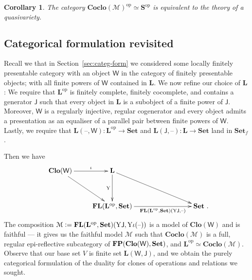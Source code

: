\documentclass[11pt, a4paper, twoside,leqno]{amsart}
\newcommand{\cat}[1]{\mathbf{#1}}
\newcommand{\thg}{{\mathord{\text{--}}}}
\newcommand{\defeq}{\mathrel{\mathop:}=}
\newcommand{\cd}[2][]{\vcenter{\hbox{\xymatrix#1{#2}}}}
\numberwithin{equation}{section}
\theoremstyle{plain}
\newtheorem{Cor}[Thm]{Corollary}
\theoremstyle{definition}
\newcommand{\Set}{\cat{Set}}
\DeclareMathOperator{\FP}{\bf FP}
\DeclareMathOperator{\FL}{\bf FL}
\begin{document}
\begin{Cor}
  \label{cor:cocloMop-qv-theory}
  The category \(\cat{Coclo}(\mathcal{M})^{\mathrm{op}}\simeq \cat{S}^{\mathrm{op}}\) is
  equivalent to the theory of a quasivariety.
\end{Cor}

\subsection{Categorical formulation revisited}
\label{sec:categ-form-revis}

Recall we that in Section~\ref{sec:categ-form} we considered some
locally finitely presentable category with an object \(\mathsf{W}\) in
the category of finitely
presentable objects; with all finite powers of \(\mathsf{W}\)
contained in \(\cat{L}\). We now refine our choice of \(\cat{L}\): We
require that \(\cat{L}^{\mathrm{op}}\) is finitely complete, finitely
cocomplete, and contains a generator \(\mathsf{J}\) such that every
object in \(\cat{L}\) is a subobject of a finite power of
\(\mathsf{J}\). Moreover, \(\mathsf{W}\) is a regularly injective, regular
cogenerator and every object admits a presentation as an equaliser of
a parallel pair between finite powers of \(\mathsf{W}\). Lastly, we
require that \(\cat{L}(\thg,\mathsf{W}) \colon \cat{L}^{\mathrm{op}}
\rightarrow \Set \) and \(\cat{L}(\mathsf{J},\thg) \colon \cat{L}
\rightarrow \Set \) land in \(\cat{Set}_{f}\).

Then we have
\begin{equation}
  \label{eq:M-coclo-to-clo}
  \xymatrixrowsep{3pc}
  \cd{
    {\cat{Clo}(\mathsf{W})} \ar[r]^-{\iota} \ar[dr]_-{
    } & 
    {\cat{L}} \ar[d]_-{\mathrm{Y}
    } \ar[drrr]
    & \\
    & {\FL(\cat{L}^{\mathrm{op}},\Set)}
    \ar[rrr]_-{\FL(\cat{L}^{\mathrm{op}},\Set)(\mathrm{Y}
      \mathsf{J}, \thg)      
    } &&& {\Set}\rlap{ .}
    }  
\end{equation}
The composition \(\mathcal{M}\defeq \FL(\cat{L}^{\mathrm{op}},\Set)(\mathrm{Y}
      \mathsf{J}, \mathrm{Y}
      \iota(\thg))\) is a model of \(\cat{Clo}(\mathsf{W})\) and is
      faithful --- it gives us the faithful model \(\mathcal{M}\) such
      that \(\cat{Coclo}(\mathcal{M})\) is a full, regular epi-reflective
      subcategory of \(\FP(\cat{Clo}(\mathsf{W}),\Set)\), and 
      \(\cat{L}^{\mathrm{op}} \simeq \cat{Coclo}(\mathcal{M})\).
      Observe that our base set \(V\) is finite set
      \(\cat{L}(\mathsf{W},\mathsf{J})\), and we obtain the purely
      categorical formulation of the duality for clones of operations
      and relations 
      we sought.
\end{document}
